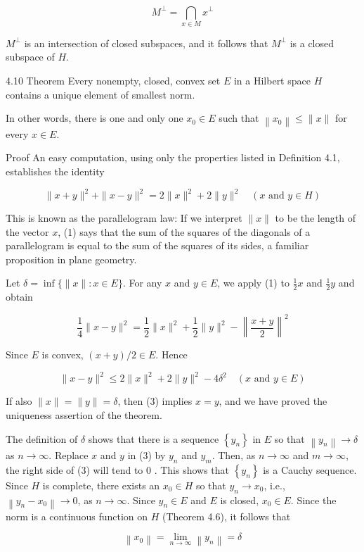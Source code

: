 \documentclass[10pt]{article}
\begin{document}
$$
M^{\perp}=\bigcap_{x \in M} x^{\perp}
$$

$M^{\perp}$ is an intersection of closed subspaces, and it follows that $M^{\perp}$ is a closed subspace of $H$.

4.10 Theorem Every nonempty, closed, convex set $E$ in a Hilbert space $H$ contains a unique element of smallest norm.

In other words, there is one and only one $x_{0} \in E$ such that $\left\|x_{0}\right\| \leq\|x\|$ for every $x \in E$.

Proof An easy computation, using only the properties listed in Definition 4.1, establishes the identity

$$
\|x+y\|^{2}+\|x-y\|^{2}=2\|x\|^{2}+2\|y\|^{2} \quad(x \text { and } y \in H)
$$

This is known as the parallelogram law: If we interpret $\|x\|$ to be the length of the vector $x$, (1) says that the sum of the squares of the diagonals of a parallelogram is equal to the sum of the squares of its sides, a familiar proposition in plane geometry.

Let $\delta=\inf \{\|x\|: x \in E\}$. For any $x$ and $y \in E$, we apply (1) to $\frac{1}{2} x$ and $\frac{1}{2} y$ and obtain

$$
\frac{1}{4}\|x-y\|^{2}=\frac{1}{2}\|x\|^{2}+\frac{1}{2}\|y\|^{2}-\left\|\frac{x+y}{2}\right\|^{2}
$$

Since $E$ is convex, $(x+y) / 2 \in E$. Hence

$$
\|x-y\|^{2} \leq 2\|x\|^{2}+2\|y\|^{2}-4 \delta^{2} \quad(x \text { and } y \in E)
$$

If also $\|x\|=\|y\|=\delta$, then (3) implies $x=y$, and we have proved the uniqueness assertion of the theorem.

The definition of $\delta$ shows that there is a sequence $\left\{y_{n}\right\}$ in $E$ so that $\left\|y_{n}\right\| \rightarrow \delta$ as $n \rightarrow \infty$. Replace $x$ and $y$ in (3) by $y_{n}$ and $y_{m}$. Then, as $n \rightarrow \infty$ and $m \rightarrow \infty$, the right side of (3) will tend to 0 . This shows that $\left\{y_{n}\right\}$ is a Cauchy sequence. Since $H$ is complete, there exists an $x_{0} \in H$ so that $y_{n} \rightarrow x_{0}$, i.e., $\left\|y_{n}-x_{0}\right\| \rightarrow 0$, as $n \rightarrow \infty$. Since $y_{n} \in E$ and $E$ is closed, $x_{0} \in E$. Since the norm is a continuous function on $H$ (Theorem 4.6), it follows that

$$
\left\|x_{0}\right\|=\lim _{n \rightarrow \infty}\left\|y_{n}\right\|=\delta
$$
\end{document}
